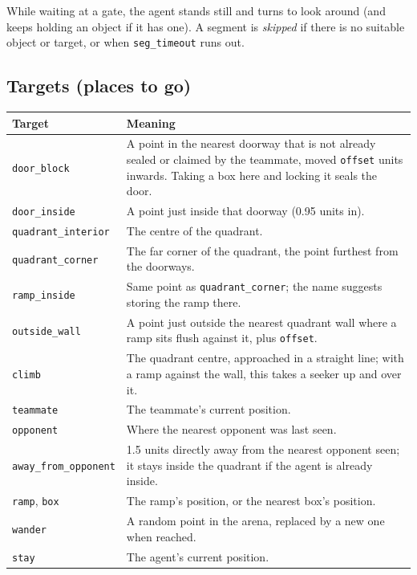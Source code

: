 \documentclass[11pt]{article}
\begin{document}
\medskip
While waiting at a gate, the agent stands still and turns to look around (and
keeps holding an object if it has one). A segment is \emph{skipped} if there is no
suitable object or target, or when \texttt{seg\_timeout} runs out.

\subsection{Targets (places to go)}
\label{sec:targets}

\begin{tabularx}{\linewidth}{@{}l Y@{}}
  \toprule
  Target & Meaning \\
  \midrule
  \texttt{door\_block}         & A point in the nearest doorway that is not already sealed or claimed
                                 by the teammate, moved \texttt{offset} units inwards. Taking a box here
                                 and locking it seals the door. \\
  \texttt{door\_inside}        & A point just inside that doorway (0.95 units in). \\
  \texttt{quadrant\_interior}  & The centre of the quadrant. \\
  \texttt{quadrant\_corner}    & The far corner of the quadrant, the point furthest from the doorways. \\
  \texttt{ramp\_inside}        & Same point as \texttt{quadrant\_corner}; the name suggests storing the
                                 ramp there. \\
  \texttt{outside\_wall}       & A point just outside the nearest quadrant wall where a ramp sits flush
                                 against it, plus \texttt{offset}. \\
  \texttt{climb}               & The quadrant centre, approached in a straight line; with a ramp against
                                 the wall, this takes a seeker up and over it. \\
  \texttt{teammate}            & The teammate's current position. \\
  \texttt{opponent}            & Where the nearest opponent was last seen. \\
  \texttt{away\_from\_opponent} & 1.5 units directly away from the nearest opponent seen; it stays
                                 inside the quadrant if the agent is already inside. \\
  \texttt{ramp}, \texttt{box}  & The ramp's position, or the nearest box's position. \\
  \texttt{wander}              & A random point in the arena, replaced by a new one when reached. \\
  \texttt{stay}                & The agent's current position. \\
  \bottomrule
\end{tabularx}
\end{document}

